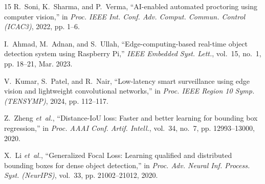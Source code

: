 \documentclass[conference]{IEEEtran}
\begin{document}
\begin{thebibliography}{15}
R.~Soni, K.~Sharma, and P.~Verma, ``AI-enabled automated proctoring using computer vision,'' in \emph{Proc. IEEE Int. Conf. Adv. Comput. Commun. Control (ICAC3)}, 2022, pp. 1--6.

I.~Ahmad, M.~Adnan, and S.~Ullah, ``Edge-computing-based real-time object detection system using Raspberry Pi,'' \emph{IEEE Embedded Syst. Lett.}, vol.~15, no.~1, pp. 18--21, Mar. 2023.

V.~Kumar, S.~Patel, and R.~Nair, ``Low-latency smart surveillance using edge vision and lightweight convolutional networks,'' in \emph{Proc. IEEE Region 10 Symp. (TENSYMP)}, 2024, pp. 112--117.

Z.~Zheng \emph{et~al.}, ``Distance-IoU loss: Faster and better learning for bounding box regression,'' in \emph{Proc. AAAI Conf. Artif. Intell.}, vol.~34, no.~7, pp. 12993--13000, 2020.

X.~Li \emph{et~al.}, ``Generalized Focal Loss: Learning qualified and distributed bounding boxes for dense object detection,'' in \emph{Proc. Adv. Neural Inf. Process. Syst. (NeurIPS)}, vol.~33, pp. 21002--21012, 2020.

\end{thebibliography}
\end{document}
